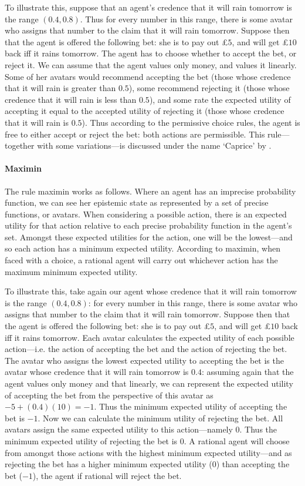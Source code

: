To illustrate this, suppose that an agent's credence that it will rain tomorrow is the range $(0.4, 0.8)$. Thus for every number in this range, there is some avatar who assigns that number to the claim that it will rain tomorrow. Suppose then that the agent is offered the following bet: she is to pay out £$5$, and will get £$10$ back iff it rains tomorrow. The agent has to choose whether to accept the bet, or reject it. We can assume that the agent values only money, and values it linearly. Some of her avatars would recommend accepting the bet (those whose credence that it will rain is greater than $0.5$), some recommend rejecting it (those whose credence that it will rain is less than $0.5$), and some rate the expected utility of accepting it equal to the accepted utility of rejecting it (those whose credence that it will rain is $0.5$). Thus according to the permissive choice rules, the agent is free to either accept or reject the bet: both actions are permissible. This rule---together with some variations---is discussed under the name `Caprice' by \citet{weatherson1998}. 

\paragraph{Maximin} The rule maximin works as follows. Where an agent has an imprecise probability function, we can see her epistemic state as represented by a set of precise functions, or avatars. When considering a possible action, there is an expected utility for that action relative to each precise probability function in the agent's set. Amongst these expected utilities for the action, one will be the lowest---and so each action has a minimum expected utility. According to maximin, when faced with a choice, a rational agent will carry out whichever action has the maximum minimum expected utility. 

To illustrate this, take again our agent whose credence that it will rain tomorrow is the range $(0.4, 0.8)$: for every number in this range, there is some avatar who assigns that number to the claim that it will rain tomorrow. Suppose then that the agent is offered the following bet: she is to pay out £$5$, and will get £$10$ back iff it rains tomorrow. Each avatar calculates the expected utility of each possible action---i.e. the action of accepting the bet and the action of rejecting the bet. The avatar who assigns the lowest expected utility to accepting the bet is the avatar whose credence that it will rain tomorrow is $0.4$: assuming again that the agent values only money and that linearly, we can represent the expected utility of accepting the bet from the perspective of this avatar as $-5 + (0.4)(10) = -1$. Thus the minimum expected utility of accepting the bet is $-1$. Now we can calculate the minimum utility of rejecting the bet. All avatars assign the same expected utility to this action---namely $0$. Thus the minimum expected utility of rejecting the bet is $0$. A rational agent will choose from amongst those actions with the highest minimum expected utility---and as rejecting the bet has a higher minimum expected utility ($0$) than accepting the bet ($-1$), the agent if rational will reject the bet. 

